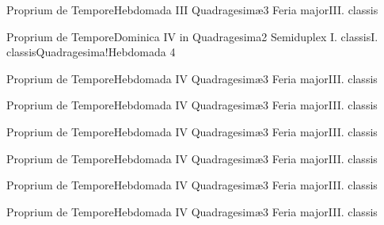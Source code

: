 \documentclass[liber-responsorialis.tex]{subfiles}
\begin{document}
	{Proprium de Tempore}{Hebdomada III Quadragesimæ}{3}{}
	{Feria major}{III. classis}{}
	{}
	{}

	{Proprium de Tempore}{Dominica IV in Quadragesima}{2}{}
	{Semiduplex I. classis}{I. classis}{Quadragesima!Hebdomada 4}
	{}
	{}

	{Proprium de Tempore}{Hebdomada IV Quadragesimæ}{3}{}
	{Feria major}{III. classis}{}
	{}
	{}

	{Proprium de Tempore}{Hebdomada IV Quadragesimæ}{3}{}
	{Feria major}{III. classis}{}
	{}
	{}

	{Proprium de Tempore}{Hebdomada IV Quadragesimæ}{3}{}
	{Feria major}{III. classis}{}
	{}
	{}

	{Proprium de Tempore}{Hebdomada IV Quadragesimæ}{3}{}
	{Feria major}{III. classis}{}
	{}
	{}

	{Proprium de Tempore}{Hebdomada IV Quadragesimæ}{3}{}
	{Feria major}{III. classis}{}
	{}
	{}

	{Proprium de Tempore}{Hebdomada IV Quadragesimæ}{3}{}
	{Feria major}{III. classis}{}
	{}
	{}
\end{document}
